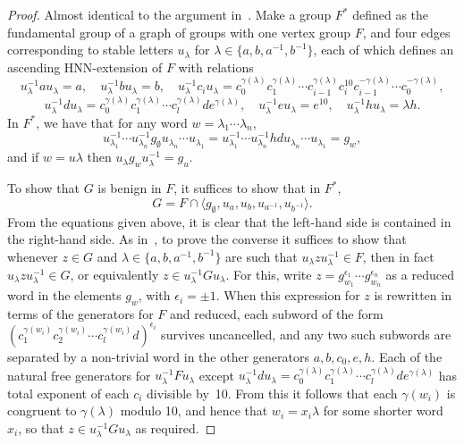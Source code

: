 \documentclass[12pt,a4paper]{article}
\begin{document}
\begin{proof} 
Almost identical to the argument in~\cite[IV.7]{lynsch}.  Make a group 
$F^*$ defined as the fundamental group of a graph of 
groups with one vertex group $F$, and four edges corresponding to 
stable letters 
$u_\lambda$ for $\lambda\in\{a,b,a^{-1},b^{-1}\}$, each of which 
defines an ascending HNN-extension of $F$ with relations 
\[u_\lambda^{-1}au_\lambda = a, \quad
u_\lambda^{-1}bu_\lambda = b, \quad
u_\lambda^{-1}c_iu_\lambda= c_0^{\gamma(\lambda)}c_1^{\gamma(\lambda)} 
\cdots c_{i-1}^{\gamma(\lambda)}
c_i^{10}
c_{i-1}^{-\gamma(\lambda)}\cdots 
c_0^{-\gamma(\lambda)},\]
\[
u_\lambda^{-1}du_\lambda = c_0^{\gamma(\lambda)}c_1^{\gamma(\lambda)} \cdots
c_l^{\gamma(\lambda)}de^{\gamma(\lambda)},\quad 
u_\lambda^{-1}eu_\lambda = e^{10},\quad 
u_\lambda^{-1}hu_\lambda = \lambda h.
\]
In $F^*$, we have that for any word $w=\lambda_1\cdots \lambda_n$, 
$$u_{\lambda_1}^{-1}\cdots 
u_{\lambda_n}^{-1}g_\emptyset u_{\lambda_n}\cdots u_{\lambda_1}= 
u_{\lambda_1}^{-1}\cdots 
u_{\lambda_n}^{-1}hd u_{\lambda_n}\cdots u_{\lambda_1}= g_w,$$ 
and if $w=u\lambda$ then $u_\lambda g_w u_\lambda^{-1} = g_u$.  

To show that $G$ is benign in $F$, it suffices to show that in $F^*$, 
$$G=F\cap \langle g_\emptyset,u_a,u_b,u_{a^{-1}},u_{b^{-1}}\rangle.$$
From the equations given above, it is clear that the left-hand side is
contained in the right-hand side.  As in~\cite[IV.7]{lynsch}, to prove
the converse it suffices to show that whenever $z\in G$ and
$\lambda\in\{a,b,a^{-1},b^{-1}\}$ are such that $u_\lambda
zu_\lambda^{-1}\in F$, then in fact $u_\lambda z u_\lambda^{-1} \in G$, 
or equivalently $z\in u_\lambda^{-1} Gu_\lambda$.
For this, write $z=g_{w_1}^{\epsilon_1}\cdots g_{w_n}^{\epsilon_n}$ as a
reduced word in the elements $g_w$, with $\epsilon_i=\pm 1$.  When
this expression for $z$ is rewritten in terms of the generators for
$F$ and reduced, each subword of the form
$(c_1^{\gamma(w_i)}c_2^{\gamma(w_i)}\cdots c_l^{\gamma(w_i)}d)^{\epsilon_i}$ 
survives uncancelled, and any two 
such subwords are separated by a non-trivial word in the other 
generators $a,b,c_0,e,h$.  
Each of the natural free generators for $u_\lambda^{-1}Fu_\lambda$ except  
$u_\lambda^{-1}du_\lambda= c_0^{\gamma(\lambda)}c_1^{\gamma(\lambda)}\cdots 
c_l^{\gamma(\lambda)}de^{\gamma(\lambda)}$ has total exponent of each 
$c_i$ divisible by~10.  From this it follows that each $\gamma(w_i)$ 
is congruent to $\gamma(\lambda)$ modulo 10, and hence that 
$w_i = x_i\lambda$ for some shorter word $x_i$, so that $z\in 
u_\lambda^{-1}Gu_\lambda$ as required.  
\end{proof}
\end{document}
